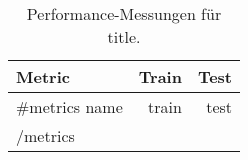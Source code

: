 \begin{table}[ht]
  \centering
  \caption{Performance-Messungen für {{title}}. }

  \begin{tabular}{lrr}
    \toprule
    \bf Metric & \bf Train & \bf Test \\
    \midrule
    {{#metrics}}
      {{name}} & {{train}} & {{test}} \\
    {{/metrics}}
    \bottomrule
  \end{tabular}
\end{table}
